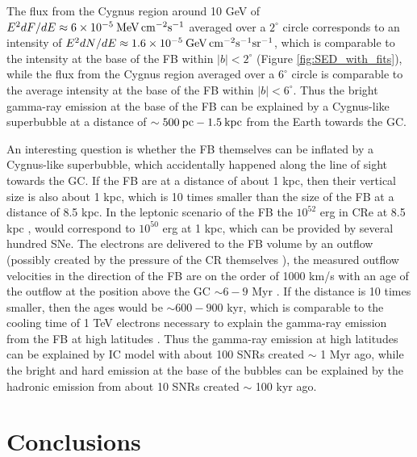 The flux from the Cygnus region around 10 GeV of 
$E^2 {dF}/{dE} \approx 6\times 10^{-5}\: {\rm MeV\, cm^{-2} s^{-1}}$
averaged over a $2^\circ$ circle
corresponds to an intensity of $E^2 {dN}/{dE} \approx 1.6\times 10^{-5}\: {\rm GeV\, cm^{-2} s^{-1}sr^{-1}}$,
which is comparable to the intensity at the base of the FB within $|b| < 2^\circ$ (Figure \ref{fig:SED_with_fits}),
while the flux from the Cygnus region averaged over a $6^\circ$ circle is comparable to the average intensity
at the base of the FB within $|b| < 6^\circ$.
Thus the bright gamma-ray emission at the base of the FB can be explained by a Cygnus-like 
superbubble at a distance of $\sim 500\:{\rm pc} - 1.5 \:{\rm kpc}$ from the Earth towards the GC.

An interesting question is whether the FB themselves can be inflated by a Cygnus-like superbubble,
which accidentally happened along the line of sight towards the GC.
If the FB are at a distance of about 1 kpc, then their vertical size is also about 1 kpc,
which is 10 times smaller than the size of the FB at a distance of 8.5 kpc.
In the leptonic scenario of the FB the $10^{52}$ erg in CRe at 8.5 kpc \citep{2014ApJ...793...64A},
would correspond to $10^{50}$ erg at 1 kpc, which can be provided by several hundred SNe.
The electrons are delivered to the FB volume by an outflow 
(possibly created by the pressure of the CR themselves \citep{2018MNRAS.475..570J}),
the measured outflow velocities in the direction of the FB are on the order of 1000 km/s
with an age of the outflow at the position above the GC $\sim 6 - 9$ Myr \citep{2015ApJ...799L...7F, 2017ApJ...834..191B} .
If the distance is 10 times smaller, then the ages would be $\sim 600 - 900$ kyr,
which is comparable to the cooling time of 1 TeV electrons necessary to explain the 
gamma-ray emission from the FB at high latitudes \citep{2014ApJ...793...64A}.
Thus the gamma-ray emission at high latitudes can be explained by IC model with about 100 SNRs
created $\sim$ 1 Myr ago, while the bright and hard emission at the base of the bubbles can
be explained by the hadronic emission from about 10 SNRs created $\sim$ 100 kyr ago.


\section{Conclusions}





